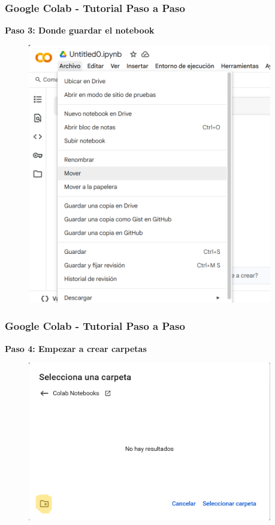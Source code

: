 \documentclass[10pt]{beamer}
\begin{document}
\begin{frame}
  \frametitle{Google Colab - Tutorial Paso a Paso}
  \begin{center}
    \textbf{Paso 3: Donde guardar el notebook}
  \end{center}
  \begin{figure}
    \includegraphics[width=0.95\textwidth]{2) Colab/GColab03.png}
  \end{figure}
\end{frame}

\begin{frame}
  \frametitle{Google Colab - Tutorial Paso a Paso}
  \begin{center}
    \textbf{Paso 4: Empezar a crear carpetas}
  \end{center}
  \begin{figure}
    \includegraphics[width=0.95\textwidth]{2) Colab/GColab04.png}
  \end{figure}
\end{frame}
\end{document}
